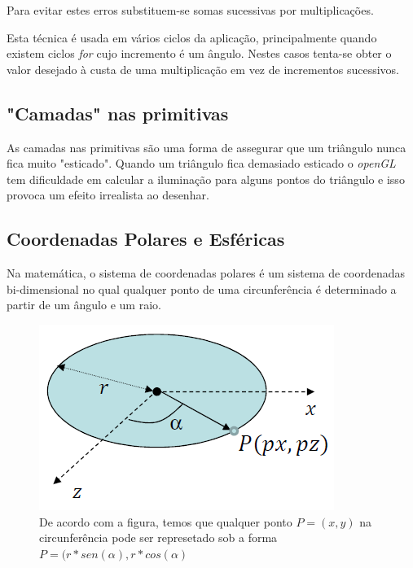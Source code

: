 \documentclass[a5paper,onecolumn, 11pt]{article}
\begin{document}
Para evitar estes erros substituem-se somas sucessivas por multiplicações.

Esta técnica é usada em vários ciclos da aplicação, principalmente quando existem ciclos \textit{for} cujo incremento é um ângulo. Nestes casos tenta-se obter o valor desejado à custa de uma multiplicação em vez de incrementos sucessivos.

\newpage
\subsection{"Camadas" nas primitivas} \label{Camadas nas primitivas}
As camadas nas primitivas são uma forma de assegurar que um triângulo nunca fica muito "esticado". Quando um triângulo fica demasiado esticado o \textit{openGL} tem dificuldade em calcular a iluminação para alguns pontos do triângulo e isso provoca um efeito irrealista ao desenhar.

\subsection{Coordenadas Polares e Esféricas} \label{CoordenadasPolaresEEsfericas}
Na matemática, o sistema de coordenadas polares é um sistema de coordenadas bi-dimensional no qual qualquer ponto de uma circunferência é determinado a partir de um ângulo e um raio.

\begin{figure}[!htb]
    \centering
    \includegraphics[scale=0.5]{coordPolares.png}
    \caption[Coordenadas Polares]{De acordo com a figura, temos que qualquer ponto \hbox{$P = (x,y)$} na circunferência pode ser represetado sob a forma \hbox{$P = ( r * sen(\alpha), r * cos(\alpha)$}}
\end{figure}
\end{document}
